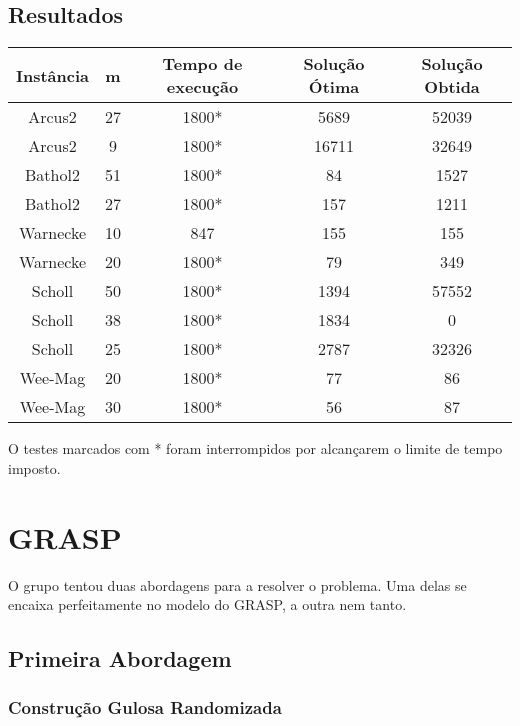 \documentclass{report}
\begin{document}
\section{Resultados}

\begin{table}[htbp]
 \begin{tabular}{|c|c|c|c|c|}
  \hline
  \textbf{Instância} & \textbf{m} & \textbf{Tempo de execução} & \textbf{Solução Ótima} & \textbf{Solução Obtida} \\
  \hline
  Arcus2 & 27 & 1800* & 5689  & 52039 \\
  \hline
  Arcus2 & 9 & 1800* & 16711 & 32649 \\
  \hline
  Bathol2 & 51 & 1800* & 84 & 1527 \\
  \hline
  Bathol2 & 27 & 1800* & 157 & 1211 \\
  \hline
  Warnecke & 10 & 847 & 155 & 155 \\
  \hline
  Warnecke & 20 & 1800* & 79 & 349 \\
  \hline
  Scholl & 50 & 1800* & 1394 & 57552 \\
  \hline
  Scholl & 38 & 1800* & 1834 & 0 \\
  \hline
  Scholl & 25 & 1800* & 2787 & 32326 \\
  \hline
  Wee-Mag & 20 & 1800* & 77 & 86 \\
  \hline
  Wee-Mag & 30 & 1800* & 56 & 87 \\
  \hline
 \end{tabular}
\end{table}

O testes marcados com * foram interrompidos por alcançarem o limite de tempo imposto.



\chapter{GRASP}

O grupo tentou duas abordagens para a resolver o problema. Uma delas se encaixa
perfeitamente no modelo do GRASP,  a outra nem tanto.

\section{Primeira Abordagem}

\subsection{Construção Gulosa Randomizada}
\end{document}
